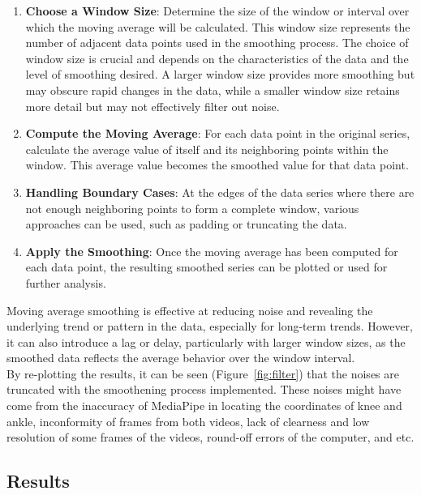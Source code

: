 \documentclass[conference]{IEEEtran}
\begin{document}
\begin{enumerate}
    \item \textbf{Choose a Window Size}: Determine the size of the window or interval over which the moving average will be calculated. This window size represents the number of adjacent data points used in the smoothing process. The choice of window size is crucial and depends on the characteristics of the data and the level of smoothing desired. A larger window size provides more smoothing but may obscure rapid changes in the data, while a smaller window size retains more detail but may not effectively filter out noise.
    
    \item \textbf{Compute the Moving Average}: For each data point in the original series, calculate the average value of itself and its neighboring points within the window. This average value becomes the smoothed value for that data point.
    
    \item \textbf{Handling Boundary Cases}: At the edges of the data series where there are not enough neighboring points to form a complete window, various approaches can be used, such as padding or truncating the data.
    
    \item \textbf{Apply the Smoothing}: Once the moving average has been computed for each data point, the resulting smoothed series can be plotted or used for further analysis.
\end{enumerate}

Moving average smoothing is effective at reducing noise and revealing the underlying trend or pattern in the data, especially for long-term trends. However, it can also introduce a lag or delay, particularly with larger window sizes, as the smoothed data reflects the average behavior over the window interval. \\

By re-plotting the results, it can be seen (Figure~\ref{fig:filter}) that the noises are truncated with the smoothening process implemented. These noises might have come from the inaccuracy of MediaPipe in locating the coordinates of knee and ankle, inconformity of frames from both videos, lack of clearness and low resolution of some frames of the videos, round-off errors of the computer, and etc.

\subsection{Results}
\end{document}
